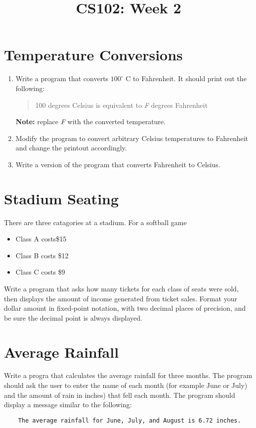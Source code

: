 \documentclass{article}
\begin{document}
\title{CS102: Week 2}

\maketitle

\section*{Temperature Conversions}
\begin{enumerate}
\item Write a program that converts $100^{\circ}$ C to Fahrenheit. It should print out the following:
	\begin{quote}
	100 degrees Celsius is equivalent to \textit{F} degrees Fahrenheit
	\end{quote}
\textbf{Note:} replace \textit{F} with the converted temperature. 
\item Modify the program to convert arbitrary Celsius temperatures to Fahrenheit and change the printout accordingly.
\item Write a version of the program that converts Fahrenheit to Celsius. 
\end{enumerate}

\section*{Stadium Seating}
There are three catagories at a stadium. For a softball game
\begin{itemize}
	\item Class A costs\$15
	\item Class B costs \$12
	\item Class C costs \$9
\end{itemize}
Write a program that asks how many tickets for each class of seats were sold, then displays the amount of income generated from ticket sales. Format your dollar amount in fixed-point notation, with two decimal places of precision, and be sure the decimal point is always displayed. 

\section*{Average Rainfall}
Write a progra that calculates the average rainfall for three months. The program should ask the user to enter the name of each month (for example June or July) and the amount of rain in inches) that fell each month. The program should display a message similar to the following:
\begin{verbatim}
	The average rainfall for June, July, and August is 6.72 inches. 
\end{verbatim}
\break
\end{document}

